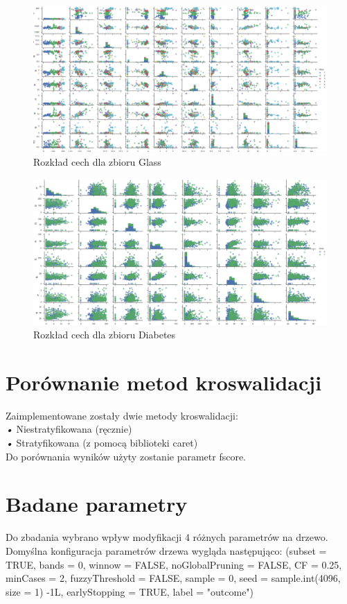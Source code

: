 \documentclass[12pt,a4paper]{article}
\begin{document}
\begin{figure}[H]
\centering
\includegraphics[width=1\textwidth]{dsGlassCombined.png}
\caption{Rozkład cech dla zbioru Glass}
\end{figure}

\begin{figure}[H]
\centering
\includegraphics[width=1\textwidth]{dsDiabetesCombined.png}
\caption{Rozkład cech dla zbioru Diabetes}
\end{figure}

\section{Porównanie metod kroswalidacji}
Zaimplementowane zostały dwie metody kroswalidacji:
\\
\textsl{•} Niestratyfikowana (ręcznie)
\\
\textsl{•} Stratyfikowana (z pomocą biblioteki caret)
\\
Do porównania wyników użyty zostanie parametr fscore.







\section{Badane parametry}
Do zbadania wybrano wpływ modyfikacji 4 różnych parametrów na drzewo. Domyślna konfiguracja parametrów drzewa wygląda następująco:
(subset = TRUE, bands = 0, winnow = FALSE, noGlobalPruning = FALSE, CF = 0.25, minCases = 2, fuzzyThreshold = FALSE, sample = 0, seed = sample.int(4096, size = 1) -1L, earlyStopping = TRUE, label = "outcome")
\end{document}
